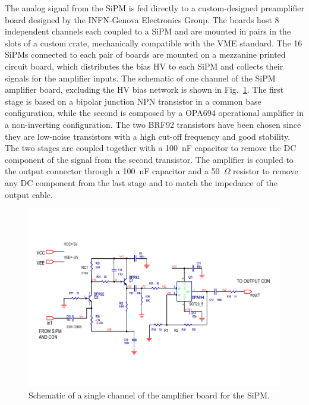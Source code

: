 The analog signal from the SiPM is fed directly to a custom-designed preamplifier board designed by the
INFN-Genova Electronics Group. The boards host 8 independent channels each coupled to a SiPM and are mounted
in pairs in the slots of a custom crate, mechanically compatible with the VME standard. The 16 SiPMs connected to
each pair of boards are mounted on a mezzanine printed circuit board, which distributes the bias HV to each SiPM
and collects their signals for the amplifier inputs. The schematic of one channel of the SiPM amplifier board,
excluding the HV bias network is shown in Fig.~\ref{Fig:FTHODOAmpBoard}. The first stage is based on a bipolar
junction NPN transistor in a common base configuration, while the second is composed by a OPA694 operational
amplifier in a non-inverting configuration. The two BRF92 transistors have been chosen since they are low-noise
transistors with a high cut-off frequency and good stability. The two stages are coupled together with a 100~nF
capacitor to remove the DC component of the signal from the second transistor. The amplifier is coupled to the
output connector through a 100~nF capacitor and a 50~$\Omega$ resistor to remove any DC component from the
last stage and to match the impedance of the output cable. 

\begin{figure}[th!]
\centering 
\includegraphics[width=1.0\columnwidth]{./fig/FTHODOAmpBoard.pdf} 
\caption{Schematic of a single channel of the amplifier board for the SiPM.} 
\label{Fig:FTHODOAmpBoard} 
\end{figure}

